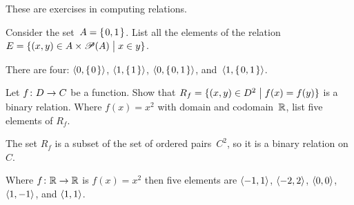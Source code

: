 \documentclass{ibl}  %
\begin{document}
\begin{problem}
These are exercises in computing relations.
\begin{exes}
\begin{exercise}
  Consider the set~$A=\mbox{$\{\hspace{0.1em}0,1\hspace{0.1em}\}$}$.
  List all the elements of the relation 
  $E=\{(x,y)\in A\times\mathscr{P}(A) \bigm| x\in y\}$.
\end{exercise}
\begin{answer}
  There are four: $\langle0,\mbox{$\{\hspace{0.1em}0\hspace{0.1em}\}$}\rangle$, 
  $\langle1,\mbox{$\{\hspace{0.1em}1\hspace{0.1em}\}$}\rangle$, $\langle0,\mbox{$\{\hspace{0.1em}0,1\hspace{0.1em}\}$}\rangle$, 
  and~$\langle1,\mbox{$\{\hspace{0.1em}0,1\hspace{0.1em}\}$}\rangle$.   
\end{answer}
\begin{exercise} 
  Let $\mbox{$f\colon D\to C$}$ be a function.
  Show that 
  $R_f=\{(x,y)\in D^2 \bigm| f(x)=f(y)\}$
  is a binary relation.
  Where $f(x)=x^2$ with domain and codomain~$\mathbb{R}$,
  list five elements of $R_f$. 
\end{exercise}
\begin{answer}
  The set $R_f$ is a subset of the set of ordered pairs~$C^2$,
  so it is a binary relation on~$C$.

  Where $\mbox{$f\colon \mathbb{R}\to \mathbb{R}$}$ is $f(x)=x^2$ then five elements are
  $\langle-1,1\rangle$, $\langle-2,2\rangle$, $\langle0,0\rangle$,
  $\langle1,-1\rangle$, and $\langle1,1\rangle$.  
\end{answer}
\end{exes}

\end{problem}
\end{document}
